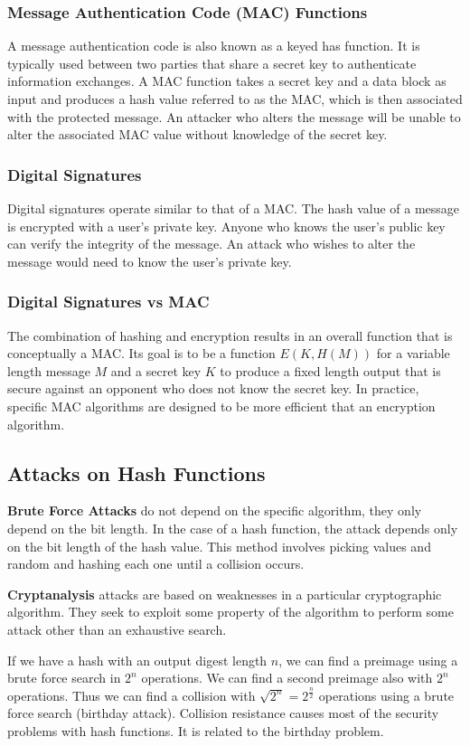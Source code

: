 \documentclass{math}
\begin{document}
\subsubsection*{Message Authentication Code (MAC) Functions}
A message authentication code is also known as a keyed has function. It is
typically used between two parties that share a secret key to authenticate
information exchanges. A MAC function takes a secret key and a data block as
input and produces a hash value referred to as the MAC, which is then associated
with the protected message. An attacker who alters the message will be unable to
alter the associated MAC value without knowledge of the secret key.

\subsubsection*{Digital Signatures}
Digital signatures operate similar to that of a MAC. The hash value of a message
is encrypted with a user's private key. Anyone who knows the user's public key
can verify the integrity of the message. An attack who wishes to alter the
message would need to know the user's private key.

\subsubsection*{Digital Signatures vs MAC}
The combination of hashing and encryption results in an overall function that is
conceptually a MAC. Its goal is to be a function \( E(K,H(M)) \) for a variable
length message \( M \) and a secret key \( K \) to produce a fixed length output
that is secure against an opponent who does not know the secret key. In
practice, specific MAC algorithms are designed to be more efficient that an
encryption algorithm.

\subsection*{Attacks on Hash Functions}
\textbf{Brute Force Attacks} do not depend on the specific algorithm, they only
depend on the bit length. In the case of a hash function, the attack depends
only on the bit length of the hash value. This method involves picking values
and random and hashing each one until a collision occurs. \par
\textbf{Cryptanalysis} attacks are based on weaknesses in a particular
cryptographic algorithm. They seek to exploit some property of the algorithm to
perform some attack other than an exhaustive search. \par
If we have a hash with an output digest length \( n \), we can find a preimage
using a brute force search in \( 2^n \) operations. We can find a second
preimage also with \( 2^n \) operations. Thus we can find a collision with
\( \sqrt{2^n} = 2^{\frac{n}{2}} \) operations using a brute force search
(birthday attack). Collision resistance causes most of the security problems
with hash functions. It is related to the birthday problem.
\end{document}
